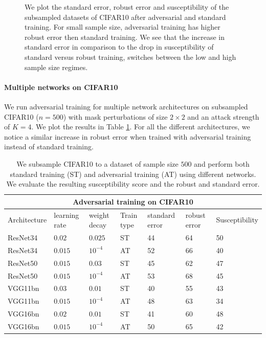 \begin{figure}[!b]
\caption{We plot the standard error, robust error and susceptibility of the subsampled datasets of 
CIFAR10 after adversarial and standard training. For small sample size, adversarial 
training has higher robust error then standard training. We see that the increase in standard error in comparison to the drop in susceptibility of standard versus robust training, switches between the low and high sample size regimes.}
\label{fig:num_obs_CIFAR}
\end{figure}

\paragraph{Multiple networks on CIFAR10}
We run adversarial training for multiple network architectures on subsampled CIFAR10 ($n=500$) with mask perturbations of size $2 \times 2$ and an attack strength of $K=4$.  We plot the results in Table \ref{CIFAR10_diffArchitectures}. For all the different architectures, we notice a similar increase in robust error when trained with adversarial training instead of standard training.

\begin{table}[!ht]
\centering
\caption{We subsample CIFAR10 to a dataset of sample size $500$ and perform both standard training (ST) and adversarial training (AT) using different networks. We evaluate the resulting susceptibility score and the robust and standard error. }
\begin{tabular}{ |p{2cm}||p{2cm}||p{1cm}||p{1cm}|p{2cm}|p{2cm}|p{2cm}|}
 \hline
 \multicolumn{7}{|c|}{Adversarial training on CIFAR10} \\
 \hline
Architecture & learning rate & weight decay & Train type & standard error & robust error & Susceptibility\\
 \hline
 ResNet34 &   $ 0.02$  & $0.025$ &   ST  & 44 & 64 & 50 \\
 ResNet34 &   $0.015$  & $10^{-4}$ &   AT & 52 & 66 & 40\\
 ResNet50 &  $0.015$  & $0.03$  &   ST &  45 & 62 & 47\\
 ResNet50 &  $0.015$  &  $10^{-4}$ &   AT &  53 & 68 & 45\\
VGG11bn &  $0.03$ & $0.01$ & ST & 40 & 55 & 43\\
VGG11bn &   $0.015$  & $10^{-4}$ & AT & 48 &63 & 34\\
VGG16bn &  $0.02$ & $0.01$ & ST & 41 & 60 & 48\\
VGG16bn &   $0.015$  & $10^{-4}$ & AT & 50 & 65  & 42\\
 \hline
\end{tabular}
\label{CIFAR10_diffArchitectures}
\end{table}

